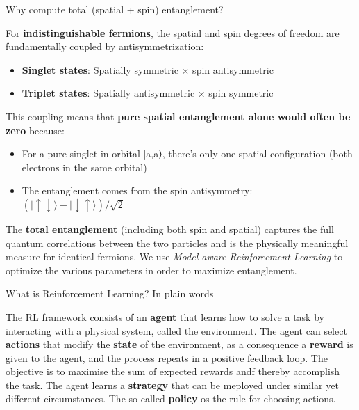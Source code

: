 \documentclass[aspectratio=169,10pt]{beamer}
\begin{document}
\begin{frame}{Why compute total (spatial + spin) entanglement?}

For \textbf{indistinguishable fermions}, the spatial and spin degrees of freedom are fundamentally coupled by antisymmetrization:
\begin{itemize}
\item \textbf{Singlet states}: Spatially symmetric × spin antisymmetric
\item \textbf{Triplet states}: Spatially antisymmetric × spin symmetric
\end{itemize}
This coupling means that \textbf{pure spatial entanglement alone would often be zero} because:
\begin{itemize}
\item For a pure singlet in orbital |a,a⟩, there's only one spatial configuration (both electrons in the same orbital)
\item The entanglement comes from the spin antisymmetry: $(|\uparrow\downarrow\rangle - |\downarrow\uparrow\rangle)/\sqrt{2}$
\end{itemize}
The \textbf{total entanglement} (including both spin and spatial) captures the full quantum correlations between the two particles and is the physically meaningful measure for identical fermions.  We use {\em Model-aware Reinforcement Learning} to optimize the various parameters in order to maximize entanglement.

\end{frame}


\begin{frame}{What is Reinforcement Learning? In plain words}
\begin{block}{}  

The RL framework consists of an {\bf agent} that learns how to solve a
task by interacting with a physical system, called the
environment. The agent can select {\bf actions} that modify the {\bf
  state} of the environment, as a consequence a {\bf reward} is given
to the agent, and the process repeats in a positive feedback loop. The
objective is to maximise the sum of expected rewards andf thereby
accomplish the task. The agent learns a {\bf strategy} that can be
meployed under similar yet different circumstances. The so-called {\bf
  policy} os the rule for choosing actions.

\end{block}
\end{frame}
\end{document}
